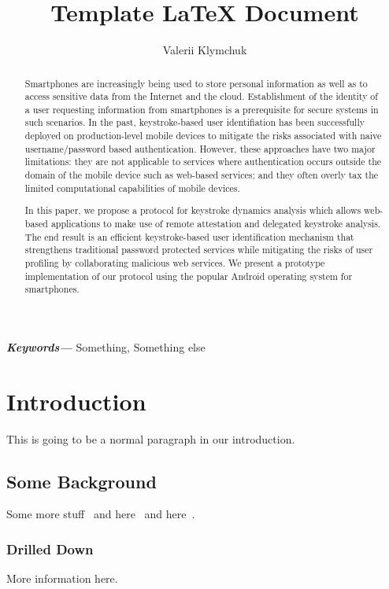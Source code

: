 \documentclass[twocolumn]{article}
\providecommand{\keywords}[1]{
	\small 
	\textbf{\textit{Keywords---}} #1
}
\begin{document}
\title{Template  LaTeX Document}
\author{Valerii Klymchuk}

\maketitle

\begin{abstract}
Smartphones are increasingly being used to store personal information as well as to access sensitive data from the Internet and the cloud. Establishment of the identity of a user requesting information from smartphones is a prerequisite for  secure systems in such scenarios. In the past, keystroke-based user identifiation has been successfully deployed on production-level mobile devices to mitigate the risks associated with naive username/password based authentication. However, these approaches have two major limitations: they are not applicable to services where authentication occurs outside the domain of the mobile
device such as web-based services; and they often overly tax the limited computational capabilities of mobile devices.

In this paper, we propose a protocol for keystroke dynamics analysis which allows web-based applications to make use of remote attestation and delegated keystroke analysis. The end result is an efficient keystroke-based user identification mechanism that strengthens traditional password protected services
while mitigating the risks of user profiling by collaborating malicious web
services. We present a prototype implementation of our protocol using
the popular Android operating system for smartphones.
\end{abstract}

\keywords{Something, Something else}

\section{Introduction} 
This is going to be a normal paragraph in our introduction. 


\subsection{Some Background} 
Some more stuff~\cite{Heilemann2012} and here~\cite{tucker1964extension} and here~\cite{10.1371/journal.pcbi.1007348}. 

\subsubsection{Drilled Down}\label{sec:drilled-down}
More information here. 
\end{document}

